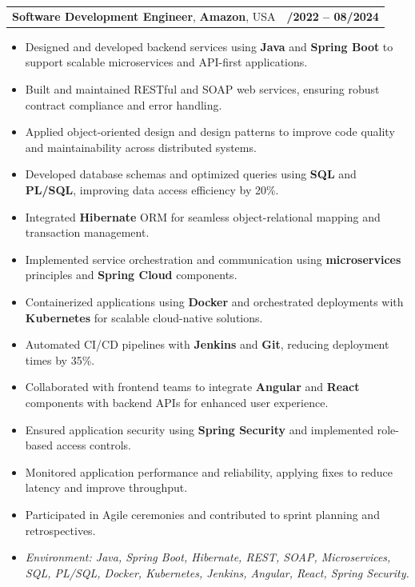 \documentclass[letterpaper,11pt]{article}
\makeatletter
\newcommand{\resumeItem}[1]{
  \item\footnotesize{
    {#1 \vspace{-2pt}}
  }
}
\newcommand{\resumeSubheading}[4]{
  \vspace{-2pt}\item
    \begin{tabular*}{1.0\textwidth}[t]{l@{\extracolsep{\fill}}r}
      \textbf{\fontsize{10pt}{14pt}\selectfont #3}, \textbf{\fontsize{10pt}{14pt}\selectfont #1}, \fontsize{10pt}{14pt}\selectfont #4 & \textbf{\fontsize{10pt}{14pt}\selectfont #2} \\
    \end{tabular*}\vspace{-7pt}
}
\newcommand{\resumeItemListStart}{\begin{itemize}[leftmargin=*]}
\newcommand{\resumeItemListEnd}{\end{itemize}\vspace{-5pt}}
\makeatother
\begin{document}
\resumeSubheading
{Amazon}{10/2022 -- 08/2024}
{Software Development Engineer}{USA}
\resumeItemListStart
  \resumeItem{Designed and developed backend services using \textbf{Java} and \textbf{Spring Boot} to support scalable microservices and API-first applications.}
  \resumeItem{Built and maintained RESTful and SOAP web services, ensuring robust contract compliance and error handling.}
  \resumeItem{Applied object-oriented design and design patterns to improve code quality and maintainability across distributed systems.}
  \resumeItem{Developed database schemas and optimized queries using \textbf{SQL} and \textbf{PL/SQL}, improving data access efficiency by 20\%.}
  \resumeItem{Integrated \textbf{Hibernate} ORM for seamless object-relational mapping and transaction management.}
  \resumeItem{Implemented service orchestration and communication using \textbf{microservices} principles and \textbf{Spring Cloud} components.}
  \resumeItem{Containerized applications using \textbf{Docker} and orchestrated deployments with \textbf{Kubernetes} for scalable cloud-native solutions.}
  \resumeItem{Automated CI/CD pipelines with \textbf{Jenkins} and \textbf{Git}, reducing deployment times by 35\%.}
  \resumeItem{Collaborated with frontend teams to integrate \textbf{Angular} and \textbf{React} components with backend APIs for enhanced user experience.}
  \resumeItem{Ensured application security using \textbf{Spring Security} and implemented role-based access controls.}
  \resumeItem{Monitored application performance and reliability, applying fixes to reduce latency and improve throughput.}
  \resumeItem{Participated in Agile ceremonies and contributed to sprint planning and retrospectives.}
  \resumeItem{\textit{Environment: Java, Spring Boot, Hibernate, REST, SOAP, Microservices, SQL, PL/SQL, Docker, Kubernetes, Jenkins, Angular, React, Spring Security.}}
\resumeItemListEnd
\end{document}
